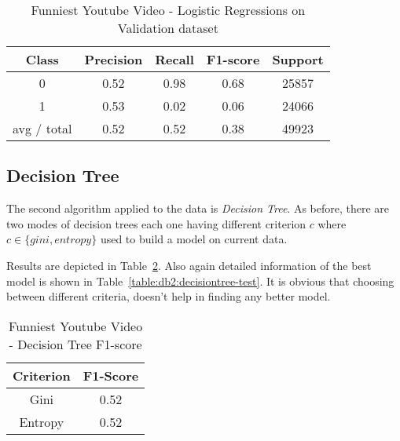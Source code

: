 \begin{table}[p]
\begin{center}
\begin{tabular}{|c|c|c|c|c|}
\hline Class & Precision & Recall & F1-score & Support \\

\hline 0 & 0.52 & 0.98 & 0.68 & 25857\\
\hline 1 & 0.53 & 0.02 & 0.06 & 24066\\
\hline avg / total & 0.52 & 0.52 & 0.38 & 49923\\
\hline
\end{tabular}

\caption{Funniest Youtube Video - Logistic Regressions on Validation dataset}
\label{table:ds3:logisticregression-test}
\end{center}
\end{table}

\subsection{Decision Tree}

The second algorithm applied to the data is {\it Decision Tree}. As before, there
are two modes of decision trees each one having different criterion $c$ where
$ c \in\{ gini,entropy\}$ used to build a model on current data.

Results are depicted in Table~\ref{table:ds3:decisiontree}. Also again detailed
information of the best model is shown in
Table~\ref{table:db2:decisiontree-test}. It is obvious that choosing between
different criteria, doesn't help in finding any better model.

\begin{table}[p]
\begin{center}
\begin{tabular}{|c|c|}
\hline Criterion & F1-Score \\

\hline Gini & 0.52 \\

\hline Entropy & 0.52 \\

\hline
\end{tabular}

\caption{Funniest Youtube Video - Decision Tree F1-score}
\label{table:ds3:decisiontree}
\end{center}
\end{table}


